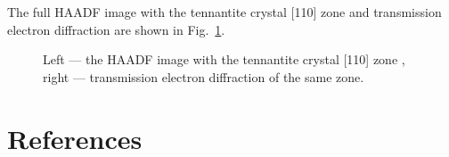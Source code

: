 \documentclass[preprint,review,12pt]{elsarticle}
\begin{document}
The full HAADF image with the tennantite crystal [110] zone and  transmission electron diffraction are shown in Fig.~\ref{fig:TEM}.

\begin{figure}
\centering
{}
 \quad
{}
\caption{\label{fig:TEM} Left --- the HAADF image with the tennantite crystal [110] zone , right --- transmission electron diffraction of the same zone. }
\end{figure}

\section{References}\label{sec:level1}


\end{document}
